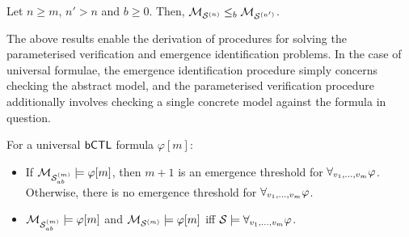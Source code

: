 \begin{theorem}
\label{th:concr-sim}
Let $n \geq m$, $n' > n$ and $b \geq 0$. Then, $\mathcal{M}_{\mathcal{S}^{(n)}}
    \leq_b \mathcal{M}_{\mathcal{S}^{(n')}}$.
\end{theorem}

The above results enable the derivation of procedures for solving
the parameterised verification and emergence identification problems. In the case
of universal formulae, the emergence identification procedure simply concerns
checking the abstract model, and the parameterised verification procedure 
additionally involves checking a single concrete model against the formula in
question.

\begin{corollary}
\label{cor:universal}
For a universal $\sf{bCTL}$ formula $\varphi[m]$:
\begin{itemize}[$\bullet$]
    \item  If $\mathcal{M}_{\mathcal{S}_{ab}^{(m)}} \models \varphi[m]$, then $m + 1$ is an emergence
    threshold for $\forall_{v_1,\ldots,v_m} \varphi$. Otherwise, there is no emergence threshold for
    $\forall_{v_1,\ldots,v_m} \varphi$.
    \item $\mathcal{M}_{\mathcal{S}_{ab}^{(m)}} \models \varphi[m]$ and $\mathcal{M}_{\mathcal{S}^{(m)}} \models \varphi[m]$ iff
    $\mathcal S \models \forall_{v_1,\ldots,v_m} \varphi$.
\end{itemize}
\end{corollary}


